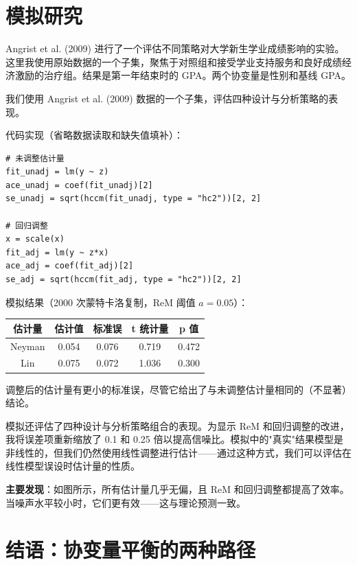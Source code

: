 \section{模拟研究}\label{sec:6-simulation}

Angrist et al. (2009) 进行了一个评估不同策略对大学新生学业成绩影响的实验。这里我使用原始数据的一个子集，聚焦于对照组和接受学业支持服务和良好成绩经济激励的治疗组。结果是第一年结束时的 GPA。两个协变量是性别和基线 GPA。

\begin{Example}[模拟研究]\label{ex:6-simulation}
我们使用 Angrist et al. (2009) 数据的一个子集，评估四种设计与分析策略的表现。

代码实现（省略数据读取和缺失值填补）：
\begin{verbatim}
# 未调整估计量
fit_unadj = lm(y ~ z)
ace_unadj = coef(fit_unadj)[2]
se_unadj = sqrt(hccm(fit_unadj, type = "hc2"))[2, 2]

# 回归调整
x = scale(x)
fit_adj = lm(y ~ z*x)
ace_adj = coef(fit_adj)[2]
se_adj = sqrt(hccm(fit_adj, type = "hc2"))[2, 2]
\end{verbatim}

模拟结果（2000 次蒙特卡洛复制，ReM 阈值 $a = 0.05$）：

\begin{center}
\begin{tabular}{ccccc}
估计量 & 估计值 & 标准误 & t 统计量 & p 值 \\
\hline
Neyman & 0.054 & 0.076 & 0.719 & 0.472 \\
Lin & 0.075 & 0.072 & 1.036 & 0.300 \\
\end{tabular}
\end{center}

调整后的估计量有更小的标准误，尽管它给出了与未调整估计量相同的（不显著）结论。
\end{Example}

模拟还评估了四种设计与分析策略组合的表现。为显示 ReM 和回归调整的改进，我将误差项重新缩放了 0.1 和 0.25 倍以提高信噪比。模拟中的"真实"结果模型是非线性的，但我们仍然使用线性调整进行估计——通过这种方式，我们可以评估在线性模型误设时估计量的性质。

\textbf{主要发现}：如图所示，所有估计量几乎无偏，且 ReM 和回归调整都提高了效率。当噪声水平较小时，它们更有效——这与理论预测一致。

\section{结语：协变量平衡的两种路径}\label{sec:6-conclusion}

